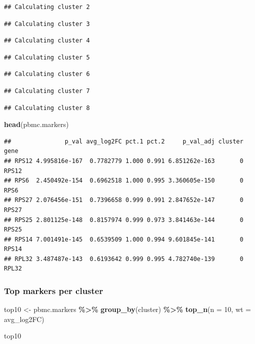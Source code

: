 \documentclass[
]{article}
\newenvironment{Shaded}{\begin{snugshade}}{\end{snugshade}}
\newcommand{\AttributeTok}[1]{\textcolor[rgb]{0.13,0.29,0.53}{#1}}
\newcommand{\DecValTok}[1]{\textcolor[rgb]{0.00,0.00,0.81}{#1}}
\newcommand{\FunctionTok}[1]{\textcolor[rgb]{0.13,0.29,0.53}{\textbf{#1}}}
\newcommand{\NormalTok}[1]{#1}
\newcommand{\OtherTok}[1]{\textcolor[rgb]{0.56,0.35,0.01}{#1}}
\newcommand{\SpecialCharTok}[1]{\textcolor[rgb]{0.81,0.36,0.00}{\textbf{#1}}}
\begin{document}
\begin{verbatim}
## Calculating cluster 2
\end{verbatim}

\begin{verbatim}
## Calculating cluster 3
\end{verbatim}

\begin{verbatim}
## Calculating cluster 4
\end{verbatim}

\begin{verbatim}
## Calculating cluster 5
\end{verbatim}

\begin{verbatim}
## Calculating cluster 6
\end{verbatim}

\begin{verbatim}
## Calculating cluster 7
\end{verbatim}

\begin{verbatim}
## Calculating cluster 8
\end{verbatim}

\begin{Shaded}
\begin{Highlighting}[]
\FunctionTok{head}\NormalTok{(pbmc.markers)}
\end{Highlighting}
\end{Shaded}

\begin{verbatim}
##               p_val avg_log2FC pct.1 pct.2     p_val_adj cluster  gene
## RPS12 4.995816e-167  0.7782779 1.000 0.991 6.851262e-163       0 RPS12
## RPS6  2.450492e-154  0.6962518 1.000 0.995 3.360605e-150       0  RPS6
## RPS27 2.076456e-151  0.7396658 0.999 0.991 2.847652e-147       0 RPS27
## RPS25 2.801125e-148  0.8157974 0.999 0.973 3.841463e-144       0 RPS25
## RPS14 7.001491e-145  0.6539509 1.000 0.994 9.601845e-141       0 RPS14
## RPL32 3.487487e-143  0.6193642 0.999 0.995 4.782740e-139       0 RPL32
\end{verbatim}

\subsubsection{Top markers per cluster}\label{top-markers-per-cluster}

\begin{Shaded}
\begin{Highlighting}[]
\NormalTok{top10 }\OtherTok{\textless{}{-}}\NormalTok{ pbmc.markers }\SpecialCharTok{\%\textgreater{}\%}
  \FunctionTok{group\_by}\NormalTok{(cluster) }\SpecialCharTok{\%\textgreater{}\%}
  \FunctionTok{top\_n}\NormalTok{(}\AttributeTok{n =} \DecValTok{10}\NormalTok{, }\AttributeTok{wt =}\NormalTok{ avg\_log2FC)}

\NormalTok{top10}
\end{Highlighting}
\end{Shaded}
\end{document}
